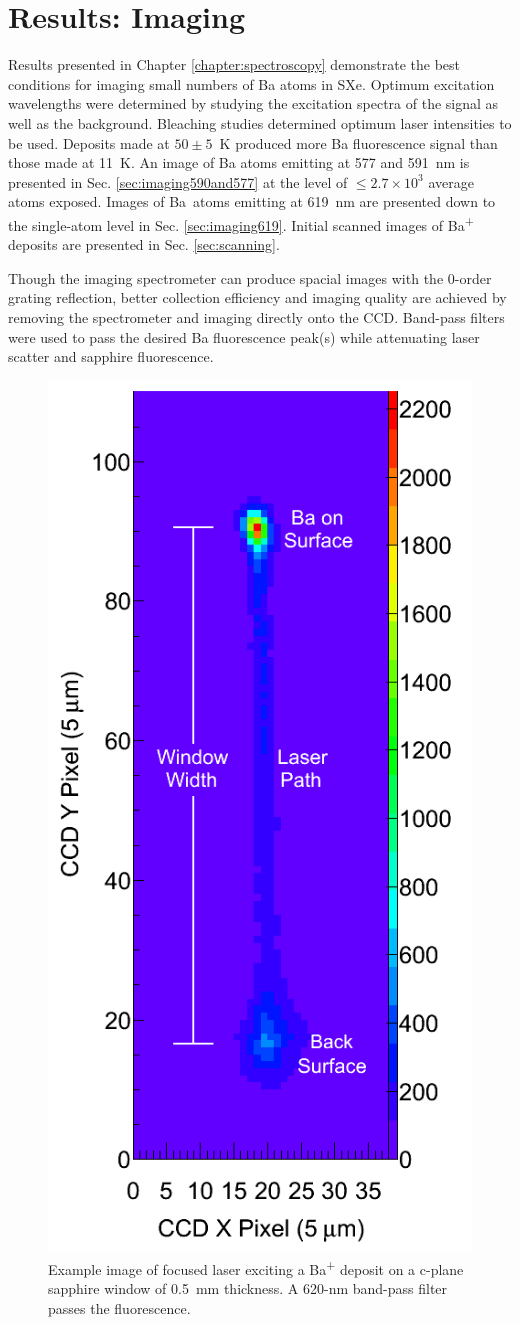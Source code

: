 \chapter{Results: Imaging}
\label{chapter:imaging}


Results presented in Chapter \ref{chapter:spectroscopy} demonstrate the best conditions for imaging small numbers of Ba atoms in SXe.  Optimum excitation wavelengths were determined by studying the excitation spectra of the signal as well as the background.  Bleaching studies determined optimum laser intensities to be used.  Deposits made at $50 \pm 5$~K produced more Ba fluorescence signal than those made at 11~K.  An image of Ba atoms emitting at 577 and 591~nm is presented in Sec. \ref{sec:imaging590and577} at the level of $\leq 2.7 \times 10^{3}$ average atoms exposed. Images of Ba\ atoms emitting at 619~nm are presented down to the single-atom level in Sec. \ref{sec:imaging619}.  Initial scanned images of Ba\textsuperscript{+} deposits are presented in Sec. \ref{sec:scanning}.

Though the imaging spectrometer can produce spacial images with the 0-order grating reflection, better collection efficiency and imaging quality are achieved by removing the spectrometer and imaging directly onto the CCD.  Band-pass filters were used to pass the desired Ba fluorescence peak(s) while attenuating laser scatter and sapphire fluorescence.

\begin{figure} %
        \centering
                \includegraphics[width=.4\textwidth]{figures/imageExamp.png}
                \caption{Example image of focused laser exciting a Ba\textsuperscript{+} deposit on a c-plane sapphire window of 0.5~mm thickness.  A 620-nm band-pass filter passes the fluorescence.}
\label{fig:imageexamp}
\end{figure}

